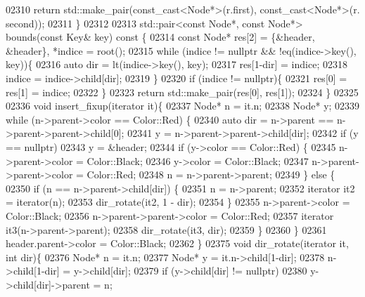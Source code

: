 \begin{DoxyCode}
02310         \textcolor{keywordflow}{return} std::make\_pair(const\_cast<Node*>(r.first), const\_cast<Node*>(r.
      second));
02311     \}
02312 
02313     std::pair<const Node*, const Node*> bounds(\textcolor{keyword}{const} Key& key)\textcolor{keyword}{ const }\{
02314         \textcolor{keyword}{const} Node* res[2] = \{&header, &header\}, *indice = root();
02315         \textcolor{keywordflow}{while} (indice != \textcolor{keyword}{nullptr} && !eq(indice->key(), key))\{
02316             \textcolor{keyword}{auto} dir = lt(indice->key(), key);
02317             res[1-dir] = indice;
02318             indice = indice->child[dir];
02319         \}
02320         \textcolor{keywordflow}{if} (indice != \textcolor{keyword}{nullptr})\{
02321             res[0] = res[1] = indice;
02322         \}
02323         \textcolor{keywordflow}{return} std::make\_pair(res[0], res[1]);
02324     \}
02325 
02336     \textcolor{keywordtype}{void} insert\_fixup(iterator it)\{
02337         Node* n = it.n;
02338         Node* y;
02339         \textcolor{keywordflow}{while} (n->parent->color == Color::Red) \{
02340             \textcolor{keyword}{auto} dir = n->parent == n->parent->parent->child[0];
02341             y = n->parent->parent->child[dir];
02342             \textcolor{keywordflow}{if} (y == \textcolor{keyword}{nullptr})
02343                 y = &header;
02344             \textcolor{keywordflow}{if} (y->color == Color::Red) \{
02345                 n->parent->color = Color::Black;
02346                 y->color = Color::Black;
02347                 n->parent->parent->color = Color::Red;
02348                 n = n->parent->parent;
02349             \} \textcolor{keywordflow}{else} \{
02350                 \textcolor{keywordflow}{if} (n == n->parent->child[dir])  \{
02351                     n = n->parent;
02352                     iterator it2 = iterator(n);
02353                     dir\_rotate(it2, 1 - dir);
02354                 \}
02355                 n->parent->color = Color::Black;
02356                 n->parent->parent->color = Color::Red;
02357                 iterator it3(n->parent->parent);
02358                 dir\_rotate(it3, dir);
02359             \}
02360         \}
02361         header.parent->color = Color::Black;
02362     \}
02375     \textcolor{keywordtype}{void} dir\_rotate(iterator it, \textcolor{keywordtype}{int} dir)\{
02376         Node* n = it.n;
02377         Node* y = it.n->child[1-dir];
02378         n->child[1-dir] = y->child[dir];
02379         \textcolor{keywordflow}{if} (y->child[dir] != \textcolor{keyword}{nullptr})
02380             y->child[dir]->parent = n;

\end{DoxyCode}
